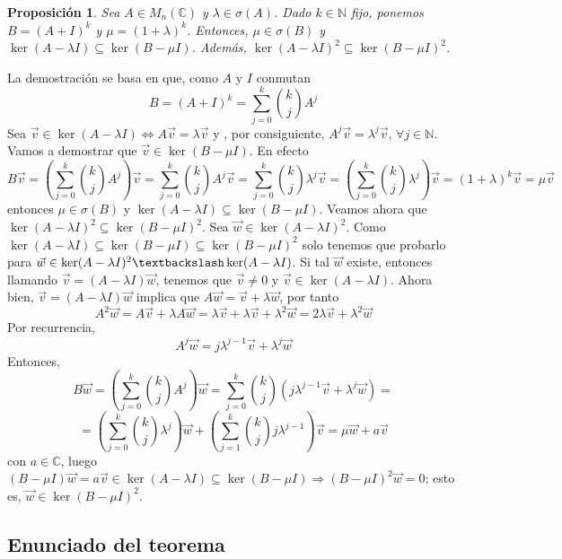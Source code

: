 \documentclass[size=a4, parskip=half, titlepage=false, toc=flat, toc=bib, 12pt]{scrartcl}
\makeatletter
\renewenvironment{proof}[1][\proofname] {\par\pushQED{\qed}\normalfont\topsep6\p@\@plus6\p@\relax\trivlist\item[\hskip\labelsep\itshape\tgpaella#1\@addpunct{.}]\ignorespaces}{\popQED\endtrivlist\@endpefalse}
\theoremstyle{theorem-style}
\newtheorem{nprop}{Proposición}[section]
\theoremstyle{definition-style}
\theoremstyle{remark-style}
\theoremstyle{example-style}
\theoremstyle{definition-style}
\theoremstyle{remark-style}
\renewcommand{\proofname}{\normalfont\tgpaella\bfseries\small DEMOSTRACIÓN}
\makeatother
\begin{document}
\begin{nprop}
\label{antes}
Sea $A\in M_n(\mathbb{C})$ y $\lambda \in \sigma(A)$. Dado $k \in \mathbb{N}$ fijo, ponemos $B = (A + I)^k$ y $\mu = (1 + \lambda)^k$. Entonces, $\mu \in \sigma(B)$ y $\ker(A - \lambda I) \subseteq \ker(B - \mu I)$. Además, $\ker(A - \lambda I)^2 \subseteq \ker(B - \mu I)^2$.
\end{nprop}
\begin{proof}
La demostración se basa en que, como $A$ y $I$ conmutan $$B = (A + I)^k = \sum_{j = 0}^k {k \choose j} A^j $$
Sea $\vec{v} \in \ker(A- \lambda I) \Leftrightarrow A \vec{v} = \lambda \vec{v}$ y , por consiguiente, $A^j \vec{v} = \lambda^j \vec{v}$, $\forall j \in \mathbb{N}$.
Vamos a demostrar que $\vec{v} \in \ker(B - \mu I)$. En efecto
$$B \vec{v} = \left( \sum_{j = 0}^k {k \choose j} A^j \right) \vec{v} = \sum_{j=0}^k {k \choose j} A^j \vec{v} = \sum_{j = 0}^k {k \choose j} \lambda^j \vec{v} = \left(\sum_{j = 0}^k {k \choose j} \lambda^j \right) \vec{v} = (1 + \lambda)^k \vec{v} = \mu \vec{v}$$
entonces $\mu \in \sigma(B)$ y $\ker(A - \lambda I) \subseteq \ker(B - \mu I)$.
Veamos ahora que $\ker(A - \lambda I)^2 \subseteq \ker(B - \mu I)^2$.
Sea $\vec{w} \in \ker(A - \lambda I)^2$. Como $\ker(A - \lambda I) \subseteq \ker(B - \mu I) \subseteq \ker(B - \mu I)^2$ solo tenemos que probarlo para $\vec{w} \in \ker(A - \lambda I)^2 \textbackslash \ker(A -\lambda I)$. Si tal $\vec{w}$ existe, entonces llamando $\vec{v} = (A - \lambda I)\vec{w}$, tenemos que   $\vec{v} \neq 0$ y $\vec{v} \in \ker(A - \lambda I)$.
Ahora bien, $\vec{v} = (A - \lambda I)\vec{w}$ implica que $A \vec{w} = \vec{v} + \lambda \vec{w}$, por tanto $$A^2 \vec{w} = A \vec{v} + \lambda A \vec{w} = \lambda \vec{v} + \lambda \vec{v} + \lambda^2 \vec{w} = 2 \lambda \vec{v} + \lambda^2 \vec{w}$$
Por recurrencia,
$$A^j \vec{w} = j \lambda^{j - 1} \vec{v} + \lambda^j \vec{w} $$
Entonces,
$$B \vec{w} = \left( \sum_{j = 0}^k {k \choose j} A^j \right)\vec{w} = \sum_{j = 0}^k {k \choose j} \left( j \lambda^{j - 1} \vec{v} + \lambda^j \vec{w} \right) =$$ $$= \left( \sum_{j=0}^k {k \choose j} \lambda^j \right) \vec{w} + \left(  \sum_{j = 1}^k {k \choose j} j \lambda^{j - 1} \right) \vec{v}  = \mu \vec{w} + a \vec{v}$$
con $a \in \mathbb{C}$, luego $(B - \mu I)\vec{w} = a \vec{v} \in \ker(A - \lambda I) \subseteq \ker(B - \mu I) \Rightarrow (B - \mu I)^2 \vec{w} = 0$; esto es, $\vec{w} \in \ker(B - \mu I)^2$.
\end{proof}

\newpage

\subsection{Enunciado del teorema}
\end{document}
